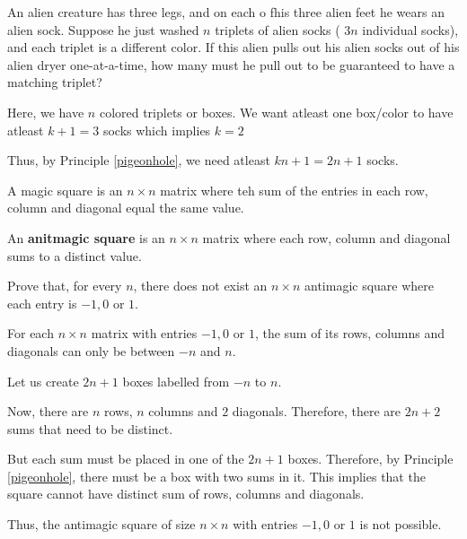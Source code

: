 \bp 
	An alien creature has three legs, and on each o fhis three alien feet he wears an alien sock. Suppose he just washed $n$ triplets of alien socks ( $3n$ individual socks), and each triplet is a different color. If this alien pulls out his alien socks out of his alien dryer one-at-a-time, how many must he pull out to be guaranteed to have a matching triplet?
\ep 

\bs
	Here, we have $n$ colored triplets or boxes. We want atleast one box/color to have atleast $k+1 = 3$ socks which implies $k = 2$

	Thus, by Principle \ref{pigeonhole}, we need atleast $kn+1 = 2n+1$ socks.
\es

\bp 
	A magic square is an $n \times n$ matrix where teh sum of the entries in each row, column and diagonal equal the same value.

	An \textbf{anitmagic square} is an $n \times n$ matrix where each row, column and diagonal sums to a distinct value.

	Prove that, for every $n$, there does not exist an $n \times n$ antimagic square where each entry is $-1,0$ or $1$.
\ep 

\bs
	For each $n \times n$ matrix with entries $-1, 0$ or $1$, the sum of its rows, columns and diagonals can only be between $-n$ and $n$.

	Let us create $2n+1$ boxes labelled from $-n$ to $n$.

	Now, there are $n$ rows, $n$ columns and $2$ diagonals. Therefore, there are $2n+2$ sums that need to be distinct.

	But each sum must be placed in one of the $2n+1$ boxes. Therefore, by Principle \ref{pigeonhole}, there must be a box with two sums in it. This implies that the square cannot have distinct sum of rows, columns and diagonals.

	Thus, the antimagic square of size $n \times n$ with entries $-1,0$ or $1$ is not possible.
\es
